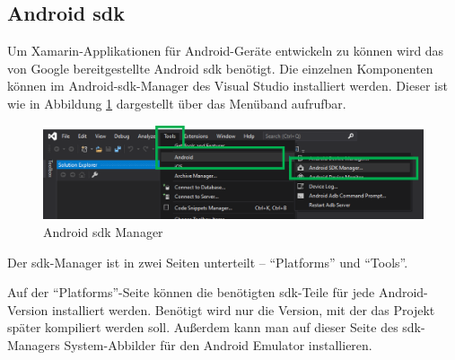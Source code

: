 \subsection{Android \ac{sdk}}
Um Xamarin-Applikationen für Android-Geräte entwickeln zu können wird das von Google bereitgestellte Android \ac{sdk} benötigt.
Die einzelnen Komponenten können im Android-\ac{sdk}-Manager des Visual Studio installiert werden.
Dieser ist wie in Abbildung \ref{fig:android-sdk-manager} dargestellt über das Menüband aufrufbar.
\begin{figure}[htbp!]
    \centering\includegraphics[width=0.9\linewidth]{images/auswahl_rahmenwerk/android_sdk_installation.png}    
    \caption{Android \ac{sdk} Manager}
    \label{fig:android-sdk-manager}
\end{figure}

Der \ac{sdk}-Manager ist in zwei Seiten unterteilt -- \enquote{Platforms} und \enquote{Tools}.\par

Auf der \enquote{Plat\-forms}-Seite können die benötigten \ac{sdk}-Teile für jede Android-Version installiert werden.
Benötigt wird nur die Version, mit der das Projekt später kompiliert werden soll.
Außerdem kann man auf dieser Seite des \ac{sdk}-Managers System-Abbilder für den Android Emulator installieren.\par

